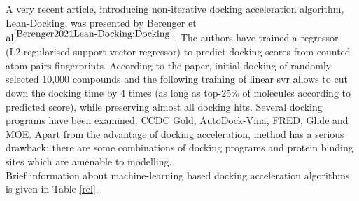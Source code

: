 A very recent article, introducing non-iterative docking acceleration algorithm, Lean-Docking, was presented by Berenger et $\text{al}^{\cite{Berenger2021Lean-Docking:Docking}}$. 
The authors have trained a regressor (L2-regularised support vector regressor) to predict docking scores from counted atom pairs fingerprints. 
According to the paper, initial docking of randomly selected 10,000 compounds and the following training of linear \acrshort{svr} allows to cut down the docking time by 4 times (as long as top-25\% of molecules according to predicted score), while preserving almost all docking hits. 
Several docking programs have been examined: CCDC Gold, AutoDock-Vina, FRED, Glide and MOE. 
Apart from the advantage of docking acceleration, method has a serious drawback: there are some combinations of docking programs and protein binding sites which are amenable to modelling.  \\


Brief information about machine-learning based docking acceleration algorithms is given in Table \ref{rel}.

